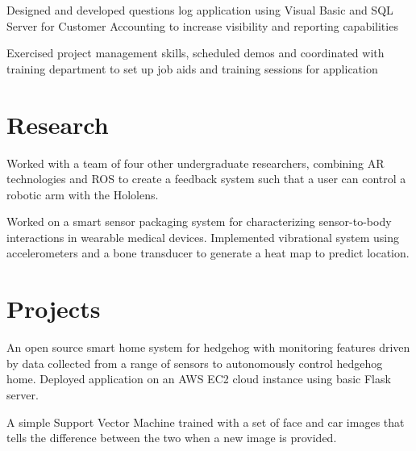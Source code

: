\documentclass[]{deedy-resume-openfont}
\begin{document}
\begin{minipage}[t]{0.66\textwidth}
\begin{tightemize}
\item Designed and developed questions log application using Visual Basic and SQL Server for Customer Accounting to increase visibility and reporting capabilities \item	Exercised project management skills, scheduled demos and coordinated with training department to set up job aids and training sessions for application \end{tightemize}
\sectionsep


\section{Research}
Worked with a team of four other undergraduate researchers, combining AR technologies and ROS to create a feedback system such that a user can control a robotic arm with the Hololens.
\sectionsep

Worked on a smart sensor packaging system for characterizing sensor-to-body interactions in wearable medical devices. Implemented vibrational system using accelerometers and a bone transducer to generate a heat map to predict location.
\sectionsep


\section{Projects}
\descript{}
An open source smart home system for hedgehog with monitoring features driven by data collected from a range of sensors to autonomously control hedgehog home. Deployed application on an AWS EC2 cloud instance using basic Flask server.
\sectionsep

\descript{}
A simple Support Vector Machine trained with a set of face and car images that tells the difference between the two when a new image is provided. 
\sectionsep



\end{minipage} 
\end{document}
